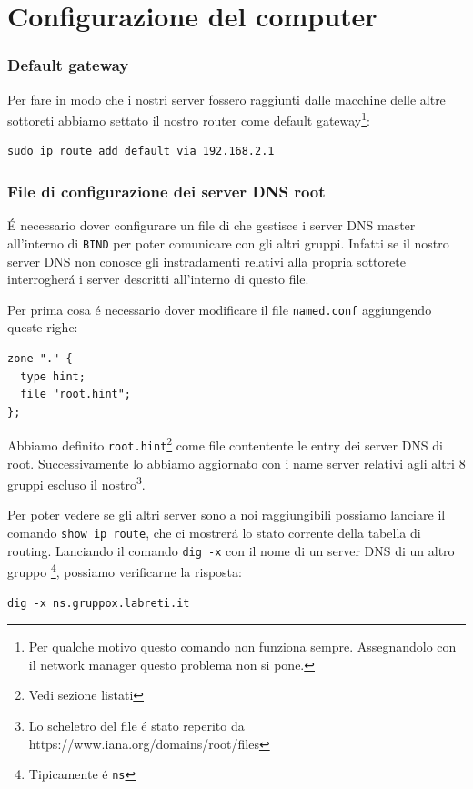 \documentclass[9pt, a4paper, oneside]{article}
\begin{document}
	\part{Configurazione del computer}
		\section{Default gateway}
			\par
				Per fare in modo che i nostri server fossero 
				raggiunti dalle macchine delle altre sottoreti
				abbiamo settato il nostro router come default 
				gateway\footnote{Per qualche motivo questo 
				comando non funziona sempre. Assegnandolo con 
				il network manager questo problema non si 
				pone.}:
				\begin{verbatim}
sudo ip route add default via 192.168.2.1
				\end{verbatim}
		\section{File di configurazione dei server DNS root}
			\par
				\'E necessario dover configurare un file di 
				che gestisce i server DNS master all'interno 
				di \texttt{BIND} per poter comunicare con gli 
				altri gruppi. Infatti se il nostro server DNS 
				non conosce gli instradamenti relativi alla 
				propria sottorete interrogher\'a i server 
				descritti all'interno di questo file.
			\par	
				Per prima cosa \'e necessario dover modificare 
				il file \texttt{named.conf} aggiungendo queste 
				righe:
				\begin{verbatim}
zone "." {
  type hint;
  file "root.hint";
};
				\end{verbatim}				
				Abbiamo definito 
				\texttt{root.hint}\footnote{Vedi sezione 
				listati} come file contentente le entry dei 
				server DNS di root. Successivamente lo 
				abbiamo aggiornato con i name server 
				relativi agli altri 8 gruppi escluso il 
				nostro\footnote{Lo scheletro del file \'e stato 
				reperito da 
				https://www.iana.org/domains/root/files}. 
			\par
				Per poter vedere se gli altri server sono a 
				noi raggiungibili possiamo lanciare il comando 
				\texttt{show ip route}, che ci mostrer\'a lo 
				stato corrente della tabella di routing.
				Lanciando il comando \texttt{dig -x} con il 
				nome di un server DNS di un altro gruppo  
				\footnote{Tipicamente \'e \texttt{ns}}, 
				possiamo verificarne la risposta:
				\begin{verbatim}
dig -x ns.gruppox.labreti.it
				\end{verbatim}
\end{document}
